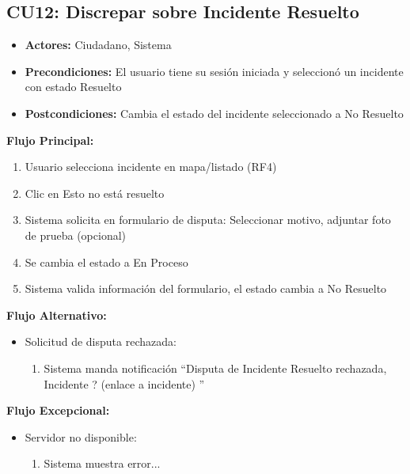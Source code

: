 \begin{multicols}{2}
\subsection*{CU12: Discrepar sobre Incidente Resuelto}
\begin{itemize}
    \item \textbf{Actores:} Ciudadano, Sistema
    \item \textbf{Precondiciones:} El usuario tiene su sesión iniciada y seleccionó un incidente con estado Resuelto
    \item \textbf{Postcondiciones:} Cambia el estado del incidente seleccionado a No Resuelto
\end{itemize}
\textbf{Flujo Principal:}
\begin{enumerate}
    \item Usuario selecciona incidente en mapa/listado (RF4)
    \item Clic en Esto no está resuelto
    \item Sistema solicita en formulario de disputa: Seleccionar motivo, adjuntar foto de prueba (opcional)
    \item Se cambia el estado a En Proceso
    \item Sistema valida información del formulario, el estado cambia a No Resuelto
\end{enumerate}

\textbf{Flujo Alternativo:}
\begin{itemize}
    \item Solicitud de disputa rechazada:
    \begin{enumerate}
        \item Sistema manda notificación ``Disputa de Incidente Resuelto rechazada, Incidente ? (enlace a incidente) ''
    \end{enumerate}
\end{itemize}

\textbf{Flujo Excepcional:}
\begin{itemize}
    \item Servidor no disponible:
    \begin{enumerate}
        \item Sistema muestra error...
    \end{enumerate}
\end{itemize}


\end{multicols}
